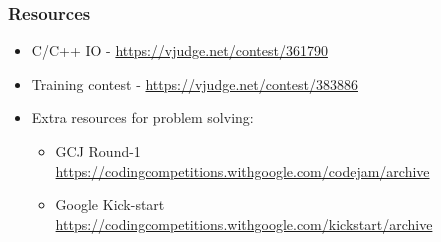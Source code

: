 \documentclass{beamer}
\begin{document}
\begin{frame}
  \frametitle{Resources}
\begin{itemize}
  \item C/C++ IO - \url{https://vjudge.net/contest/361790}
  \item Training contest - \url{https://vjudge.net/contest/383886}
  \item Extra resources for problem solving: 
  \begin{itemize}
    \item GCJ Round-1 \url{https://codingcompetitions.withgoogle.com/codejam/archive}
    \item Google Kick-start \url{https://codingcompetitions.withgoogle.com/kickstart/archive}
  \end{itemize}
  
\end{itemize}
  

\end{frame}
\end{document}
